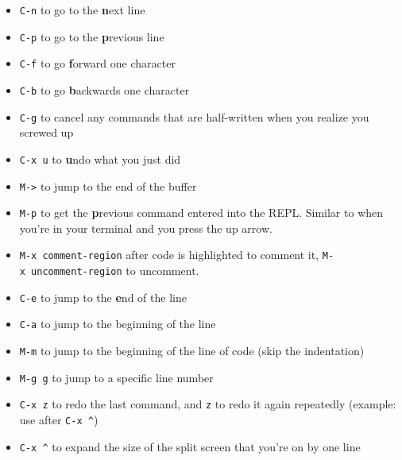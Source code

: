 \documentclass[12pt]{article}
\begin{document}
\begin{itemize}
\item
  \texttt{C-n} to go to the \textbf{n}ext line
\item
  \texttt{C-p} to go to the \textbf{p}revious line
\item
  \texttt{C-f} to go \textbf{f}orward one character
\item
  \texttt{C-b} to go \textbf{b}ackwards one character
\item
  \texttt{C-g} to cancel any commands that are half-written when you
  realize you screwed up
\item
  \texttt{C-x\ u} to \textbf{u}ndo what you just did
\item
  \texttt{M-\textgreater{}} to jump to the end of the buffer
\item
  \texttt{M-p} to get the \textbf{p}revious command entered into the
  REPL. Similar to when you're in your terminal and you press the up
  arrow.
\item
  \texttt{M-x\ comment-region} after code is highlighted to comment it,
  \texttt{M-x\ uncomment-region} to uncomment.
\item
  \texttt{C-e} to jump to the \textbf{e}nd of the line
\item
  \texttt{C-a} to jump to the beginning of the line
\item
  \texttt{M-m} to jump to the beginning of the line of code (skip the indentation)
\item
  \texttt{M-g\ g} to jump to a specific line number
\item
  \texttt{C-x z} to redo the last command, and \texttt{z} to redo it again
  repeatedly (example: use after \texttt{C-x \^})
\item
  \texttt{C-x \^} to expand the size of the split screen that you're on
  by one line
\end{itemize}
\end{document}
